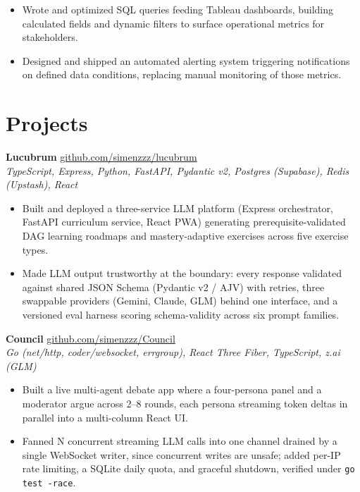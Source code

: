 \documentclass[11pt, a4paper]{article}
\begin{document}
\begin{itemize}
  \item Wrote and optimized SQL queries feeding Tableau dashboards, building
        calculated fields and dynamic filters to surface operational metrics for
        stakeholders.
  \item Designed and shipped an automated alerting system triggering notifications
        on defined data conditions, replacing manual monitoring of those metrics.
\end{itemize}

\section{Projects}

\textbf{Lucubrum} \hfill
  \href{https://github.com/simenzzz/lucubrum}{github.com/simenzzz/lucubrum} \\
\textit{TypeScript, Express, Python, FastAPI, Pydantic v2, Postgres (Supabase), Redis (Upstash), React}
\begin{itemize}
  \item Built and deployed a three-service LLM platform (Express orchestrator,
        FastAPI curriculum service, React PWA) generating prerequisite-validated
        DAG learning roadmaps and mastery-adaptive exercises across five exercise types.
  \item Made LLM output trustworthy at the boundary: every response validated
        against shared JSON Schema (Pydantic v2 / AJV) with retries, three
        swappable providers (Gemini, Claude, GLM) behind one interface, and a
        versioned eval harness scoring schema-validity across six prompt families.
\end{itemize}

\medskip

\textbf{Council} \hfill
  \href{https://github.com/simenzzz/Council}{github.com/simenzzz/Council} \\
\textit{Go (net/http, coder/websocket, errgroup), React Three Fiber, TypeScript, z.ai (GLM)}
\begin{itemize}
  \item Built a live multi-agent debate app where a four-persona panel and a
        moderator argue across 2--8 rounds, each persona streaming token deltas in
        parallel into a multi-column React UI.
  \item Fanned N concurrent streaming LLM calls into one channel drained by a
        single WebSocket writer, since concurrent writes are unsafe; added per-IP
        rate limiting, a SQLite daily quota, and graceful shutdown, verified under
        \texttt{go test -race}.
\end{itemize}
\end{document}
